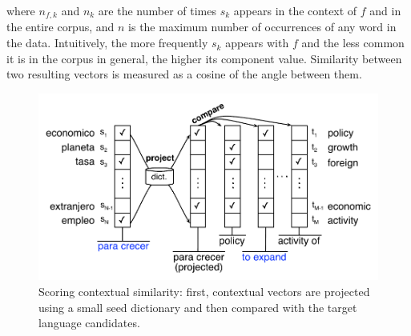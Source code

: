 \documentclass[11pt]{article}
\newcommand{\mnote}[1]{\marginpar{%
  \vskip-\baselineskip
  \raggedright\footnotesize
  \itshape\hrule\smallskip\tiny{#1}\par\smallskip\hrule}}
\newcommand{\mtodo}[1]{\mnote{\textcolor{red}{#1}}}
\begin{document}
\noindent where $n_{f,k}$ and $n_{k}$ are the number of times $s_{k}$ appears in the context of $f$ and in the entire corpus, and $n$ is the maximum number of occurrences of any word in the data.  Intuitively, the more frequently $s_{k}$ appears with $f$ and the less common it is in the corpus in general, the higher its component value.  Similarity between two resulting vectors is measured as a cosine of the angle between them.

\begin{figure}[t]
\includegraphics[width=\linewidth]{../figures/contextual/contextual}
\caption{Scoring contextual similarity: first, contextual vectors are projected using a small seed dictionary and then compared with the target language candidates.}
\label{fig:contextual}
\end{figure}

\mtodo{Give an example Spanish phrase and the English phrases that it has the highest similarity with}
\end{document}
